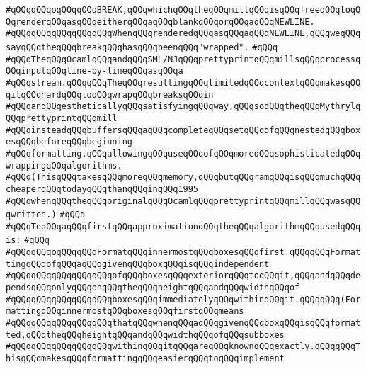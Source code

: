 \verb|#qQQqqQQqoqQQqqQQqBREAK,qQQqwhichqQQqtheqQQqmillqQQqisqQQqfreeqQQqtoqQQqrenderqQQqasqQQqeitherqQQqaqQQqblankqQQqorqQQqaqQQqNEWLINE.|\newline
\verb|#qQQqqQQqqQQqqQQqqQQqWhenqQQqrenderedqQQqasqQQqaqQQqNEWLINE,qQQqweqQQqsayqQQqtheqQQqbreakqQQqhasqQQqbeenqQQq"wrapped".|\newline
\verb|#qQQq|\newline
\verb|#qQQqTheqQQqOcamlqQQqandqQQqSML/NJqQQqprettyprintqQQqmillsqQQqprocessqQQqinputqQQqline-by-lineqQQqasqQQqa|\newline
\verb|#qQQqstream.qQQqqQQqTheqQQqresultingqQQqlimitedqQQqcontextqQQqmakesqQQqitqQQqhardqQQqtoqQQqwrapqQQqbreaksqQQqin|\newline
\verb|#qQQqanqQQqestheticallyqQQqsatisfyingqQQqway,qQQqsoqQQqtheqQQqMythrylqQQqprettyprintqQQqmill|\newline
\verb|#qQQqinsteadqQQqbuffersqQQqaqQQqcompleteqQQqsetqQQqofqQQqnestedqQQqboxesqQQqbeforeqQQqbeginning|\newline
\verb|#qQQqformatting,qQQqallowingqQQquseqQQqofqQQqmoreqQQqsophisticatedqQQqwrappingqQQqalgorithms.|\newline
\verb|#qQQq(ThisqQQqtakesqQQqmoreqQQqmemory,qQQqbutqQQqramqQQqisqQQqmuchqQQqcheaperqQQqtodayqQQqthanqQQqinqQQq1995|\newline
\verb|#qQQqwhenqQQqtheqQQqoriginalqQQqOcamlqQQqprettyprintqQQqmillqQQqwasqQQqwritten.)|\newline
\verb|#qQQq|\newline
\verb|#qQQqToqQQqaqQQqfirstqQQqapproximationqQQqtheqQQqalgorithmqQQqusedqQQqis:|\newline
\verb|#qQQq|\newline
\verb|#qQQqqQQqoqQQqqQQqFormatqQQqinnermostqQQqboxesqQQqfirst.qQQqqQQqFormattingqQQqofqQQqaqQQqgivenqQQqboxqQQqisqQQqindependent|\newline
\verb|#qQQqqQQqqQQqqQQqqQQqofqQQqboxesqQQqexteriorqQQqtoqQQqit,qQQqandqQQqdependsqQQqonlyqQQqonqQQqtheqQQqheightqQQqandqQQqwidthqQQqof|\newline
\verb|#qQQqqQQqqQQqqQQqqQQqboxesqQQqimmediatelyqQQqwithinqQQqit.qQQqqQQq(FormattingqQQqinnermostqQQqboxesqQQqfirstqQQqmeans|\newline
\verb|#qQQqqQQqqQQqqQQqqQQqthatqQQqwhenqQQqaqQQqgivenqQQqboxqQQqisqQQqformatted,qQQqtheqQQqheightqQQqandqQQqwidthqQQqofqQQqsubboxes|\newline
\verb|#qQQqqQQqqQQqqQQqqQQqwithinqQQqitqQQqareqQQqknownqQQqexactly.qQQqqQQqThisqQQqmakesqQQqformattingqQQqeasierqQQqtoqQQqimplement|\newline
